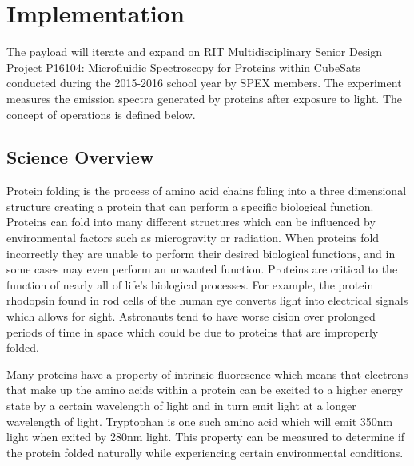 \documentclass[conference]{IEEEtran} %
\begin{document}
\section{Implementation}
\label{sec:implementation}
  
The payload will iterate and expand on RIT Multidisciplinary Senior Design Project P16104: Microfluidic Spectroscopy for Proteins within CubeSats ~\cite{msd} conducted during the 2015-2016 school year by SPEX members. The experiment measures the emission spectra generated by proteins after exposure to light. The concept of operations is defined below. 

\subsection{Science Overview}
\label{subsec:sci-overview}

Protein folding is the process of amino acid chains foling into a three dimensional structure creating a protein that can perform a specific biological function. Proteins can fold into many different structures which can be influenced by environmental factors such as microgravity or radiation. When proteins fold incorrectly they are unable to perform their desired biological functions, and in some cases may even perform an unwanted function. Proteins are critical to the function of nearly all of life's biological processes. For example, the protein rhodopsin found in rod cells of the human eye converts light into electrical signals which allows for sight. Astronauts tend to have worse cision over prolonged periods of time in space which could be due to proteins that are improperly folded. 

Many proteins have a property of intrinsic fluoresence which means that electrons that make up the amino acids within a protein can be excited to a higher energy state by a certain wavelength of light and in turn emit light at a longer wavelength of light. Tryptophan is one such amino acid which will emit 350nm light when exited by 280nm light. This property can be measured to determine if the protein folded naturally while experiencing certain environmental conditions.
\end{document}
